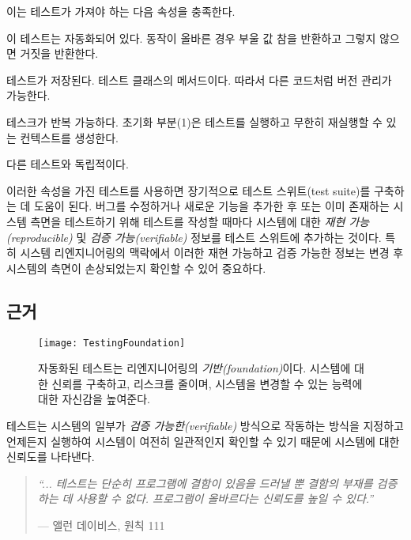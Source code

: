 \documentclass[a4paper,10pt,twoside]{book}
\begin{document}
이는 테스트가 가져야 하는 다음 속성을 충족한다.

\begin{bulletlist}
\item 이 테스트는 자동화되어 있다. 동작이 올바른 경우 부울 값 참을 반환하고 그렇지 않으면 거짓을 반환한다.
\item 테스트가 저장된다. 테스트 클래스의 메서드이다. 따라서 다른 코드처럼 버전 관리가 가능한다.
\item 테스크가 반복 가능하다. 초기화 부분(1)은 테스트를 실행하고 무한히 재실행할 수 있는 컨텍스트를 생성한다. 
\item 다른 테스트와 독립적이다. 
\end{bulletlist}

이러한 속성을 가진 테스트를 사용하면 장기적으로 테스트 스위트(test suite)를 구축하는 데 도움이 된다. 버그를 수정하거나 새로운 기능을 추가한 후 또는 이미 존재하는 시스템 측면을 테스트하기 위해 테스트를 작성할 때마다 시스템에 대한 \emph{재현 가능(reproducible)} 및 \emph{검증 가능(verifiable)} 정보를 테스트 스위트에 추가하는 것이다. 특히 시스템 리엔지니어링의 맥락에서 이러한 재현 가능하고 검증 가능한 정보는 변경 후 시스템의 측면이 손상되었는지 확인할 수 있어 중요하다.

\subsection*{근거}

\begin{figure}[h]
\begin{center}
\texttt{[image: TestingFoundation]}
\caption{자동화된 테스트는 리엔지니어링의 \emph{기반(foundation)}이다. 시스템에 대한 신뢰를 구축하고, 리스크를 줄이며, 시스템을 변경할 수 있는 능력에 대한 자신감을 높여준다.}
\end{center}
\end{figure}

\noindent
테스트는 시스템의 일부가 \emph{검증 가능한(verifiable)} 방식으로 작동하는 방식을 지정하고 언제든지 실행하여 시스템이 여전히 일관적인지 확인할 수 있기 때문에 시스템에 대한 신뢰도를 나타낸다. 

\begin{quotation}
\noindent
\emph{``... 테스트는 단순히 프로그램에 결함이 있음을 드러낼 뿐 결함의 부재를 검증하는 데 사용할 수 없다. 프로그램이 올바르다는 신뢰도를 높일 수 있다.''}

\hfill --- 앨런 데이비스, 원칙 111 \cite{Davi95a}
\end{quotation}
\end{document}

